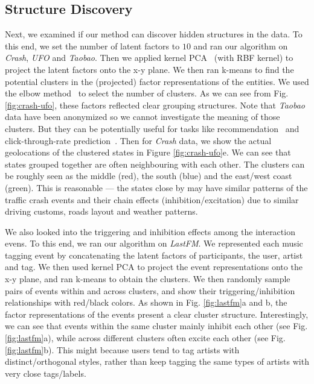 \subsection{Structure Discovery}
\vspace{-0.05in}
Next, we examined if our method can discover hidden structures in the data. To this end, we set the number of latent factors to $10$ and ran our algorithm on \textit{Crash}, \textit{UFO} and \textit{Taobao}. Then we applied kernel PCA~\citep{scholkopf1998nonlinear} (with RBF kernel) to project the latent factors onto the x-y plane. We then ran k-means to find the potential clusters in the (projected) factor representations of the entities. We used the elbow method~\citep{ketchen1996application} to select the number of clusters. As we can see from Fig. \ref{fig:crash-ufo}, these factors reflected clear grouping structures. Note that \textit{Taobao} data have been anonymized so we cannot investigate the meaning of those clusters. But they can be potentially useful for tasks like recommendation~\citep{tran2018regularizing} and click-through-rate prediction~\citep{pan2019warm}. Then for \textit{Crash} data, we show the actual geolocations of the clustered states in Figure \ref{fig:crash-ufo}e. We can see that states grouped together are often neighbouring with each other. The clusters can be roughly seen as the middle (red), the south (blue) and the east/west coast (green). This is reasonable --- the states close by may have similar patterns of the traffic crash events and their chain effects (inhibition/excitation) due to similar driving customs, roads layout and weather patterns. 

We also looked into the triggering and inhibition effects among the interaction evens. To this end, we ran our algorithm on \textit{LastFM}. We represented each music tagging event by concatenating the latent factors of participants, \ie the user, artist and tag. We then used kernel PCA to project the event representations onto the x-y plane, and ran k-means to obtain the clusters. We then randomly sample pairs of events within and across clusters, and show their triggering/inhibition relationships with red/black colors. As shown in Fig. \ref{fig:lastfm}a and b, the factor representations of the events present a clear cluster structure. Interestingly, we can see that events within the same cluster mainly inhibit each other (see Fig. \ref{fig:lastfm}a), while across different clusters often excite each other (see Fig. \ref{fig:lastfm}b). This might because users tend to tag artists with distinct/orthogonal styles, rather than keep tagging the same types of artists with very close tags/labels. 

